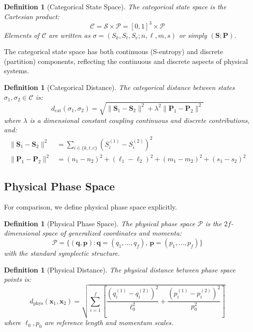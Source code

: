 \documentclass[twocolumn,10pt,twoside]{article}
\newtheorem{definition}[theorem]{Definition}
\newcommand{\Cat}{\mathcal{C}}
\newcommand{\Phys}{\mathcal{P}}
\newcommand{\Sent}{\mathcal{S}}
\newcommand{\Part}{\mathcal{P}}
\newcommand{\dcat}{d_{\mathrm{cat}}}
\newcommand{\dphys}{d_{\mathrm{phys}}}
\begin{document}
\begin{definition}[Categorical State Space]
\label{def:categorical_space}
The categorical state space is the Cartesian product:
\begin{equation}
\Cat = \Sent \times \Part = [0,1]^3 \times \Part
\end{equation}
Elements of $\Cat$ are written as $\sigma = (S_k, S_t, S_e; n, \ell, m, s)$ or simply $(\mathbf{S}; \mathbf{P})$.
\end{definition}

The categorical state space has both continuous (S-entropy) and discrete (partition) components, reflecting the continuous and discrete aspects of physical systems.

\begin{definition}[Categorical Distance]
\label{def:categorical_distance}
The categorical distance between states $\sigma_1, \sigma_2 \in \Cat$ is:
\begin{equation}
\dcat(\sigma_1, \sigma_2) = \sqrt{\|\mathbf{S}_1 - \mathbf{S}_2\|^2 + \lambda^2 \|\mathbf{P}_1 - \mathbf{P}_2\|^2}
\label{eq:cat_distance}
\end{equation}
where $\lambda$ is a dimensional constant coupling continuous and discrete contributions, and:
\begin{align}
\|\mathbf{S}_1 - \mathbf{S}_2\|^2 &= \sum_{i \in \{k,t,e\}} (S_i^{(1)} - S_i^{(2)})^2 \\
\|\mathbf{P}_1 - \mathbf{P}_2\|^2 &= (n_1 - n_2)^2 + (\ell_1 - \ell_2)^2 + (m_1 - m_2)^2 + (s_1 - s_2)^2
\end{align}
\end{definition}

\subsection{Physical Phase Space}

For comparison, we define physical phase space explicitly.

\begin{definition}[Physical Phase Space]
The physical phase space $\Phys$ is the $2f$-dimensional space of generalized coordinates and momenta:
\begin{equation}
\Phys = \{(\mathbf{q}, \mathbf{p}) : \mathbf{q} = (q_1, \ldots, q_f), \, \mathbf{p} = (p_1, \ldots, p_f)\}
\end{equation}
with the standard symplectic structure.
\end{definition}

\begin{definition}[Physical Distance]
The physical distance between phase space points is:
\begin{equation}
\dphys(\mathbf{x}_1, \mathbf{x}_2) = \sqrt{\sum_{i=1}^{f} \left[\frac{(q_i^{(1)} - q_i^{(2)})^2}{\ell_0^2} + \frac{(p_i^{(1)} - p_i^{(2)})^2}{p_0^2}\right]}
\label{eq:phys_distance}
\end{equation}
where $\ell_0, p_0$ are reference length and momentum scales.
\end{definition}
\end{document}
